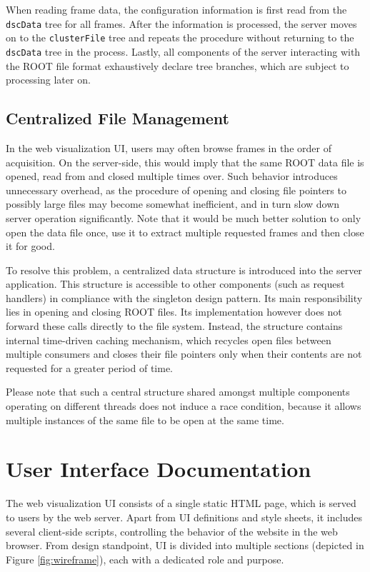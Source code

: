 When reading frame data, the configuration information is first read from the \texttt{dscData} tree for all frames. After the information is processed, the server moves on to the \texttt{clusterFile} tree and repeats the procedure without returning to the \texttt{dscData} tree in the process. Lastly, all components of the server interacting with the ROOT file format exhaustively declare tree branches, which are subject to processing later on.

\subsection{Centralized File Management}
In the web visualization UI, users may often browse frames in the order of acquisition. On the server-side, this would imply that the same ROOT data file is opened, read from and closed multiple times over. Such behavior introduces unnecessary overhead, as the procedure of opening and closing file pointers to possibly large files may become somewhat inefficient, and in turn slow down server operation significantly. Note that it would be much better solution to only open the data file once, use it to extract multiple requested frames and then close it for good.

To resolve this problem, a centralized data structure is introduced into the server application. This structure is accessible to other components (such as request handlers) in compliance with the singleton design pattern. Its main responsibility lies in opening and closing ROOT files. Its implementation however does not forward these calls directly to the file system. Instead, the structure contains internal time-driven caching mechanism, which recycles open files between multiple consumers and closes their file pointers only when their contents are not requested for a greater period of time.

Please note that such a central structure shared amongst multiple components operating on different threads does not induce a race condition, because it allows multiple instances of the same file to be open at the same time.

\section{User Interface Documentation}
The web visualization UI consists of a single static HTML page, which is served to users by the web server. Apart from UI definitions and style sheets, it includes several client-side scripts, controlling the behavior of the website in the web browser. From design standpoint, UI is divided into multiple sections (depicted in Figure \ref{fig:wireframe}), each with a dedicated role and purpose.

